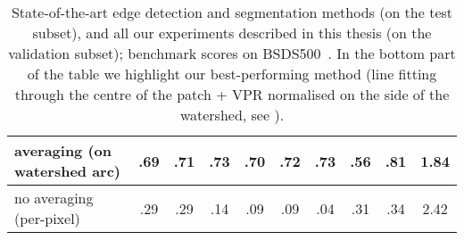 \begin{table}[htbp]
\begin{tabular}{l|c|c|c||c|c|c||c|c|c|}
\hline
\hline
\hline
\multicolumn{1}{|l|}{averaging (on watershed arc)} & {\bf .69} & {\bf .71} & {\bf .73} & {\bf .70} & {\bf .72} & {\bf .73} & {\bf .56} & {\bf .81} & {\bf 1.84} \\ %
\hline
\multicolumn{1}{|l|}{no averaging (per-pixel)} & .29 & .29 & .14 & .09 & .09 & .04 & .31 & .34 & 2.42 \\
\hline
\end{tabular}
\caption[Benchmark scores for SoA and ours]{State-of-the-art edge detection and segmentation methods (on the test subset), and all our experiments described in this thesis (on the validation subset); benchmark scores on BSDS500~\cite{BSDS500resources}. In the bottom part of the table we highlight our best-performing method (line fitting through the centre of the patch + VPR normalised on the side of the watershed, see ).}
\label{tab:all-results}
\end{table}





